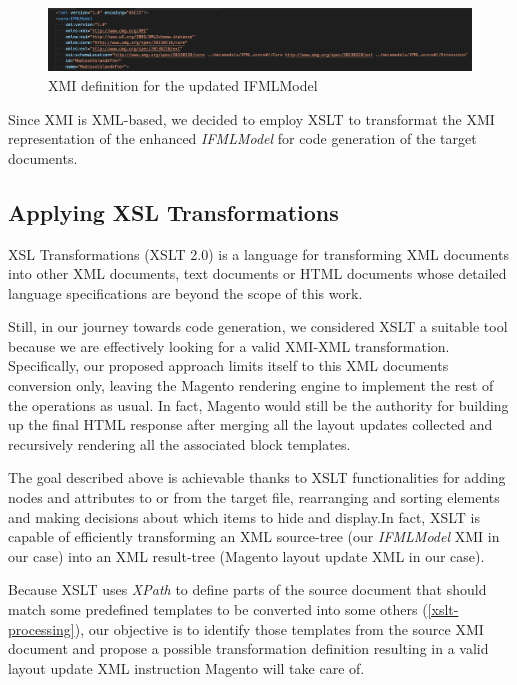 \vspace{0.5cm}
\begin{figure}[H]
  \centering
    \includegraphics[width=15cm]{images/xmi-header.png}
  \caption{XMI definition for the updated IFMLModel}
  \label{fig:xmi-header}
\end{figure}
\vspace{0.5cm}


Since XMI is XML-based, we decided to employ XSLT to transformat the XMI representation of the enhanced \textit{IFMLModel} for code generation of the target documents. 

\subsection{Applying XSL Transformations}

XSL Transformations (XSLT 2.0) is a language for transforming XML documents into other XML documents, text documents or HTML documents\cite{xslt} whose detailed language specifications are beyond the scope of this work.

Still, in our journey towards code generation, we considered XSLT a suitable tool because we are effectively looking for a valid XMI-XML transformation. Specifically, our proposed approach limits itself to this XML documents conversion only, leaving the Magento rendering engine to implement the rest of the operations as usual. In fact, Magento would still be the authority for building up the final HTML response after merging all the layout updates collected and recursively rendering all the associated block templates.

The goal described above is achievable thanks to XSLT functionalities for adding nodes and attributes to or from the target file, rearranging and sorting elements and making decisions about which items to hide and display.In fact, XSLT is capable of efficiently transforming an XML source-tree (our \textit{IFMLModel} XMI in our case) into an XML result-tree (Magento layout update XML in our case).

Because XSLT uses \textit{XPath} to define parts of the source document that should match some predefined templates to be converted into some others (\ref{xslt-processing}), our objective is to identify those templates from the source XMI document and propose a possible transformation definition resulting in a valid layout update XML instruction Magento will take care of.

